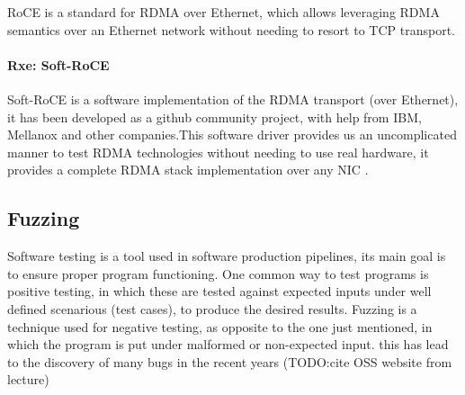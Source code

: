 RoCE is a standard for RDMA over Ethernet, which allows leveraging RDMA semantics over an Ethernet network without needing
to resort to TCP transport. 
\paragraph{Rxe: Soft-RoCE}

Soft-RoCE is a software implementation of the RDMA transport (over Ethernet), it has been developed as a github 
community project, with help from IBM, Mellanox and other companies.This software driver provides us an 
uncomplicated manner to test RDMA technologies without needing to use real hardware, it provides a complete RDMA 
stack implementation over any NIC \cite{mellanox-community}.





\subsection{Fuzzing}

Software testing is a tool used in software production pipelines, its main goal is to ensure proper program functioning. One common way to test programs is 
positive testing, in which these are tested against expected inputs under well defined scenarious (test cases), to produce the desired results.
Fuzzing is a technique used for negative testing, as opposite to the one just mentioned, in which the program is put under malformed or non-expected input. this
has lead to the discovery of many bugs in the recent years (TODO:\@ cite OSS website from lecture)

